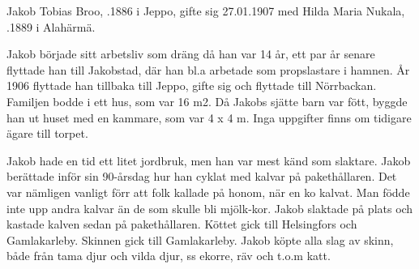 Jakob Tobias Broo, .1886 i Jeppo, gifte sig 27.01.1907 med	Hilda Maria Nukala, .1889 i Alahärmä.
\begin{jhchildren}
  \item {}
  \item {}
  \item {}
  \item {}
  \item {}
  \item {}
  \item {}
  \item {}
  \item {}
  \item {}
  \item {}
  \item {}
  \item {}
  \item {}
  \item {}
\end{jhchildren}

Jakob började sitt arbetsliv som dräng då han var 14 år, ett par år senare flyttade han till Jakobstad, där han bl.a arbetade som propslastare i hamnen. År 1906 flyttade han tillbaka till Jeppo, gifte sig och flyttade till Nörrbackan. Familjen bodde i ett hus, som var 16 m2. Då Jakobs sjätte barn var fött, byggde han ut huset med en kammare, som var 4 x 4 m. Inga uppgifter finns om tidigare ägare till torpet.

Jakob hade en tid ett litet jordbruk, men han var mest känd som slaktare. Jakob berättade inför sin 90-årsdag hur han cyklat med kalvar på pakethållaren. Det var nämligen vanligt förr att folk kallade på honom, när en ko kalvat. Man födde inte upp andra kalvar än de som skulle bli mjölk-kor. Jakob slaktade på plats och kastade kalven sedan på pakethållaren. Köttet gick till Helsingfors och Gamlakarleby. Skinnen gick till Gamlakarleby. Jakob köpte alla slag av skinn, både 			från tama djur och vilda djur, ss ekorre, räv och t.o.m katt.

